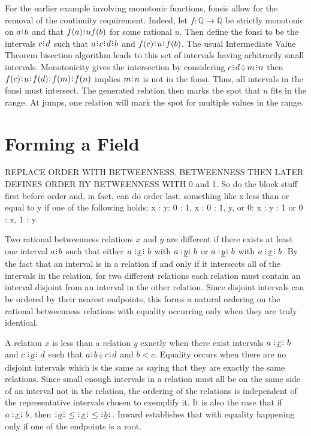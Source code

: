 \documentclass[12pt]{article}
\newcommand{\yrel}{\xrel[y]}
\begin{document}
For the earlier example involving monotonic functions, fonsis allow for the removal of the continuity requirement. Indeed, let $f: \mathbb{Q} \to \mathbb{Q}$ be strictly monotonic on $a \rint b$ and that $f(a) \rint u f(b)$ for some rational $u$. Then define the fonsi to be the intervals $c \rint d$ such that $a  \rint c \rint d \rint b$ and $f(c) \rint u \rint f(b)$. The usual Intermediate Value Theorem bisection algorithm leads to this set of intervals having arbitrarily small intervals. Monotonicity gives the intersection by considering $c \rint d \betneq m \rint n$ then $f(c) \rint u \rint f(d) \rint f(m) \rint f(n)$ implies $m \rint n$ is not in the fonsi. Thus, all intervals in the fonsi must intersect.  The generated relation then marks the spot that $u$ fits in the range. At jumps, one relation will mark the spot for multiple values in the range. 



\section{Forming a Field}

REPLACE ORDER WITH BETWEENNESS. BETWEENNESS THEN LATER DEFINES ORDER BY BETWEENNESS WITH 0 and 1. So do the block stuff first before order and, in fact, can do order last. something like x less than or equal to  y if one of the following holds: x : y: 0 : 1,   x : 0 : {1, y}, or  0: x : y : 1 or 0 : {x, 1} : y  

Two rational betweenness relations $x$ and $y$ are different if there exists at least one interval $a \rint b$ such that either $a \xrel b$ with \sout{$a \xrel[y] b$} or $a \xrel[y] b$ with \sout{$a \xrel b$}. By the fact that an interval is in a relation if and only if it intersects all of the intervals in the relation, for two different relations each relation must contain an interval disjoint from an interval in the other relation. Since disjoint intervals can be ordered by their nearest endpoints, this forms a natural ordering on the rational betweenness relations with equality occurring only when they are truly identical. 

A relation $x$ is less than a relation $y$ exactly when there exist intervals $a \xrel b$ and $c \yrel d$ such that $a \rint b \betneq c \rint d$ and $b < c$. Equality occurs when there are no disjoint intervals which is the same as saying that they are exactly the same relations. Since small enough intervals in a relation must all be on the same side of an interval not in the relation, the ordering of the relations is independent of the representative intervals chosen to exemplify it. It is also the case that if $a \xrel b$, then $\xrel[a] \leq \xrel \leq \xrel[b]$. Inward establishes that with equality happening only if one of the endpoints is a root. 
\end{document}
